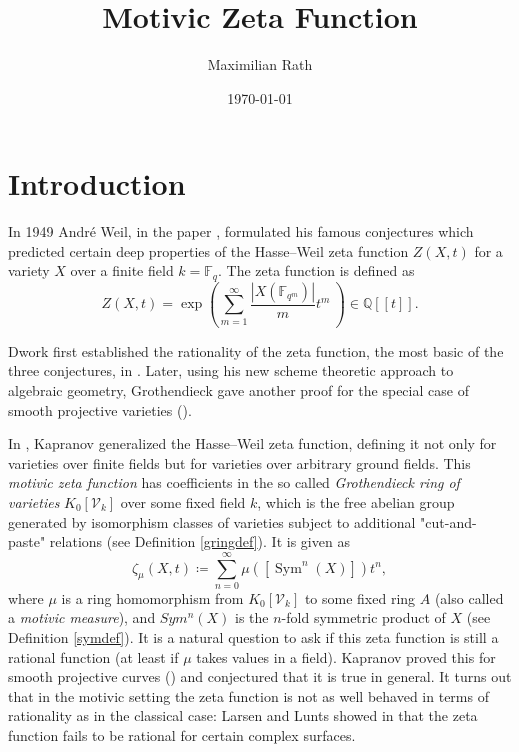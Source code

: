 \documentclass[11pt, a4paper, german, twoside]{article}
\author{Maximilian Rath}
\date{\today}
\title{Motivic Zeta Function}
\theoremstyle{plain}
\newtheorem{theorem}{Theorem}[section]
\theoremstyle{definition}
\newcommand{\gring}[1][k]{K_0[\mathcal{V}_#1]}
\DeclareMathOperator{\Sym}{Sym}
\begin{document}
\maketitle
\tableofcontents
\section{Introduction}

In 1949 Andr\'e Weil, in the paper \cite{weil1949}, formulated his famous conjectures
which predicted certain deep properties of the Hasse--Weil zeta function $Z(X,t)$ for a variety $X$ over a finite field $k = \mathbb{F}_q$.
The zeta function is defined as 
\[
    Z(X,t) = \exp \left(\sum_{m=1}^\infty \frac{|X(\mathbb{F}_{q^m})|}{m} t^m \ \right) \in \mathbb{Q}[[t]].
\]

Dwork first established the rationality of the zeta function, the most basic of the three conjectures, in \cite{Dwork}.
Later, using his new scheme theoretic approach to algebraic geometry, Grothendieck gave another proof for the special case of 
smooth projective varieties (\cite{GroRat}).


In \cite{kapranov}, Kapranov generalized the Hasse--Weil zeta function, defining it not only for varieties over finite fields
but for varieties over arbitrary ground fields. 
This \emph{motivic zeta function} has coefficients in the so called \emph{Grothendieck ring of varieties} $\gring[k]$ 
over some fixed field $k$, 
which is the free abelian group generated by isomorphism classes of varieties subject to additional "cut-and-paste" relations
(see Definition \ref{gringdef}). It is given as 
\[
    \zeta_{\mu}(X,t) \coloneqq \sum_{n=0}^{\infty} \mu \left( \left[ \Sym^n(X) \right] \right) t^n,
\]
where $\mu$ is a ring homomorphism from $\gring[k]$ to some fixed ring $A$ (also called a \emph{motivic measure}), 
and $Sym^n(X)$ is the $n$-fold symmetric product of $X$ (see Definition \ref{symdef}). 
It is a natural question to ask if this zeta function is still a rational function (at least if $\mu$ takes values in a field).
Kapranov proved this for smooth projective curves (\cite[Thm 1.1.9]{kapranov}) and conjectured that it is true in general.
It turns out that in the motivic setting the zeta function is not as well behaved in terms of rationality as in the classical case:
Larsen and Lunts showed in \cite{MR1996804} that the zeta function fails to be rational for certain complex surfaces.
\end{document}
